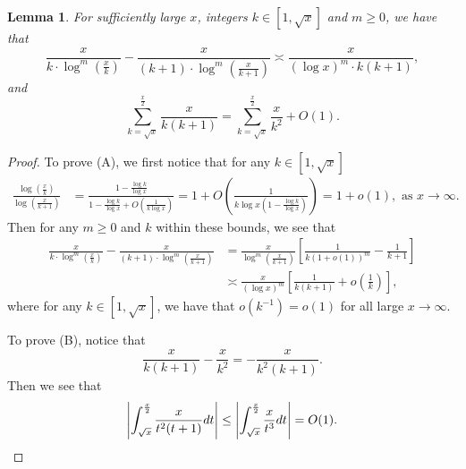 \documentclass[11pt,reqno,a4letter]{article}
\numberwithin{figure}{section}
\numberwithin{table}{section}
\theoremstyle{plain}
\newtheorem{lemma}[theorem]{Lemma}
\numberwithin{theorem}{section}
\theoremstyle{definition}
\begin{document}
\begin{lemma}
\label{lemma_PrimePix_ErrorBoundDiffs_SimplifyingConditions_v1} 
For sufficiently large $x$, integers $k \in \left[1, \sqrt{x}\right]$ and 
$m \geq 0$, we have that 
\begin{equation} 
\tag{A} 
\frac{x}{k \cdot \log^m\left(\frac{x}{k}\right)} - 
     \frac{x}{(k+1) \cdot \log^m\left(\frac{x}{k+1}\right)}
     \asymp \frac{x}{(\log x)^m \cdot k(k+1)}, 
\end{equation} 
and 
\begin{equation} 
\tag{B} 
\sum_{k=\sqrt{x}}^{\frac{x}{2}} \frac{x}{k(k+1)} = 
     \sum_{k=\sqrt{x}}^{\frac{x}{2}} \frac{x}{k^2} + O(1). 
\end{equation} 
\end{lemma} 
\begin{proof} 
To prove (A), we first notice that for any $k \in \left[1, \sqrt{x}\right]$ 
\begin{align*}
\frac{\log\left(\frac{x}{k}\right)}{\log\left(\frac{x}{k+1}\right)} & = 
     \frac{1 - \frac{\log k}{\log x}}{1 - \frac{\log k}{\log x} + O\left(\frac{1}{k\log x}\right)} 
     = 1 + O\left(\frac{1}{k\log x\left(1 - \frac{\log k}{\log x}\right)}\right) 
     = 1 + o(1), \text{\ as\ } x \rightarrow \infty. 
\end{align*}
Then for any $m \geq 0$ and $k$ within these bounds, we see that 
\begin{align*}
\frac{x}{k \cdot \log^m\left(\frac{x}{k}\right)} - 
     \frac{x}{(k+1) \cdot \log^m\left(\frac{x}{k+1}\right)} & = \frac{x}{\log^m\left(\frac{x}{k+1}\right)} \left[ 
     \frac{1}{k(1+o(1))^m} - \frac{1}{k+1}\right] \\ 
     & \asymp \frac{x}{(\log x)^m} \left[\frac{1}{k(k+1)} + o\left(\frac{1}{k}\right)\right], 
\end{align*}
where for any $k \in \left[1, \sqrt{x}\right]$, we have that 
$o\left(k^{-1}\right) = o(1)$ for all large $x \rightarrow \infty$. 

To prove (B), notice that 
\[
\frac{x}{k(k+1)} - \frac{x}{k^2} = -\frac{x}{k^2(k+1)}. 
\]
Then we see that 
\[
\left\lvert \int_{\sqrt{x}}^{\frac{x}{2}} \frac{x}{t^2(t+1)} dt \right\rvert \leq 
     \left\lvert \int_{\sqrt{x}}^{\frac{x}{2}} \frac{x}{t^3} dt \right\rvert = O(1). 
     \qedhere 
\]
\end{proof} 
\end{document}
